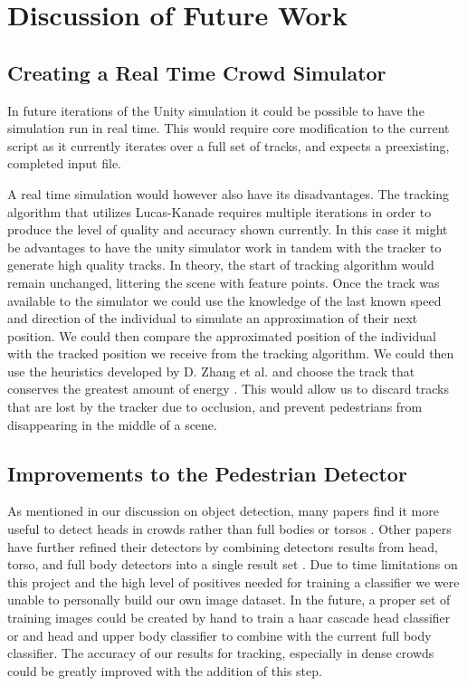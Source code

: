 \documentclass[12pt, onecolumn, conference]{IEEEtran}
\begin{document}
\section{Discussion of Future Work}

\subsection{Creating a Real Time Crowd Simulator}

In future iterations of the Unity simulation it could be possible to have the simulation run in real time. This would require core modification to the current script as it currently iterates over a full set of tracks, and expects a preexisting, completed input file.  

A real time simulation would however also have its disadvantages. The tracking algorithm that utilizes Lucas-Kanade requires multiple iterations in order to produce the level of quality and accuracy shown currently. In this case it might be advantages to have the unity simulator work in tandem with the tracker to generate high quality tracks. In theory, the start of tracking algorithm would remain unchanged, littering the scene with feature points. Once the track was available to the simulator we could use the knowledge of the last known speed and direction of the individual to simulate an approximation of their next position. We could then compare the approximated position of the individual with the tracked position we receive from the tracking algorithm. We could then use the heuristics developed by D. Zhang et al. and choose the track that conserves the greatest amount of energy \cite{D. Zhang}. This would allow us to discard tracks that are lost by the tracker due to occlusion, and prevent pedestrians from disappearing in the middle of a scene. 

\subsection{Improvements to the Pedestrian Detector}

As mentioned in our discussion on object detection, many papers find it more useful to detect heads in crowds rather than full bodies or torsos \cite{M. Rodriguez}\cite{D. Zhang}\cite{I. Ali}. Other papers have further refined their detectors by combining detectors results from head, torso, and full body detectors into a single result set \cite{G. Shu}. Due to time limitations on this project and the high level of positives needed for training a classifier we were unable to personally build our own image dataset. In the future, a proper set of training images could be created by hand to train a haar cascade head classifier or and head and upper body classifier to combine with the current full body classifier. The accuracy of our results for tracking, especially in dense crowds could be greatly improved with the addition of this step. 
\end{document}
